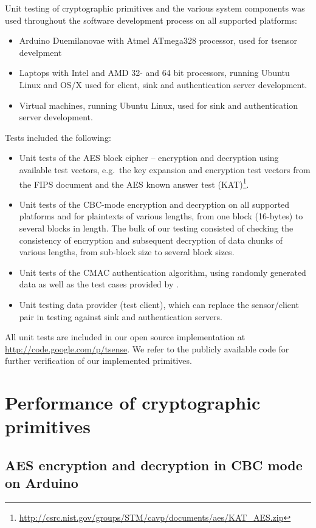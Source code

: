 Unit testing of cryptographic primitives and the various system components was used throughout the software development process on all supported platforms:
\begin{itemize}
\item Arduino Duemilanovae with Atmel ATmega328 processor, used for tsensor develpment
\item Laptops with Intel and AMD 32- and 64 bit processors, running Ubuntu Linux and OS/X used for client, sink and authentication server development.
\item Virtual machines, running Ubuntu Linux, used for sink and authentication server development.
\end{itemize}
%
Tests included the following:
%
\begin{itemize}
\item Unit tests of the AES block cipher -- encryption and decryption using available test vectors, e.g.\ the key expansion and encryption test vectors from the FIPS  document and the AES known answer test (KAT)\footnote{\url{http://csrc.nist.gov/groups/STM/cavp/documents/aes/KAT_AES.zip}}.
\item Unit tests of the CBC-mode encryption and decryption on all supported platforms and for plaintexts of various lengths, from one block (16-bytes) to several blocks in length. The bulk of our testing consisted of checking the consistency of encryption and subsequent decryption of data chunks of various lengths, from sub-block size to several block sizes. 
\item Unit tests of the CMAC authentication algorithm, using randomly generated data as well as the test cases provided by .
\item Unit testing data provider (test client), which can replace the sensor/client pair in testing against sink and authentication servers.
\end{itemize}
All unit tests are included in our open source implementation at \url{http://code.google.com/p/tsense}. We refer to the publicly available code for further verification of our implemented primitives.

\section{Performance of cryptographic primitives}

\subsection{AES encryption and decryption in CBC mode on Arduino}
\label{sec:aes-cbc-performance-arduino}


